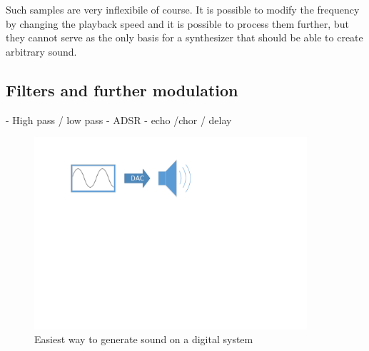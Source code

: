			Such samples are very inflexibile of course.
			It is possible to modify the frequency by changing the playback speed and it is possible to	process them further, but they cannot serve as the only basis for a synthesizer that should be able to create arbitrary sound.			
		\subsection{Filters and further modulation}
			\label{subsec:filters}
			- High pass / low pass
			- ADSR
			- echo /chor / delay	
	
	  	\begin{figure}[!h]
		\centering
			\includegraphics[width=0.90\textwidth]{images/sound_generation.pdf}
		\caption{Easiest way to generate sound on a digital system}
		\label{fig:sound_generation}
	\end{figure}
		
		
		
		
			
			
			
		
